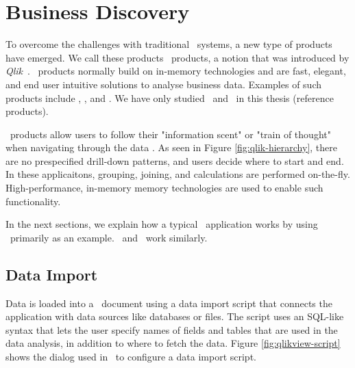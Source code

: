 \section{Business Discovery}
\label{sec:Business Discovery}
To overcome the challenges with traditional \bi~systems, a new type of products have emerged. We call these products \bd~products, a notion that was introduced by \textit{Qlik}~\cite{Qlik2014-vd}. \bd~products normally build on in-memory technologies and are fast, elegant, and end user intuitive solutions to analyse business data. Examples of such products include \powerpivot, \tableau, and \qlikview. We have only studied \qlikview~and \tableau~in this thesis (reference products). 


\bd~products allow users to follow their "information scent" or "train of thought" when navigating through the data \cite{Kamkolkar2015-iq, Qlik2014-vd}. As seen in Figure \ref{fig:qlik-hierarchy}, there are no prespecified drill-down patterns, and users decide where to start and end. In these applicaitons, grouping, joining, and calculations are performed on-the-fly. High-performance, in-memory memory technologies are used to enable such functionality. 

In the next sections, we explain how a typical \bd~application works by using \qlikview~primarily as an example. \tableau~and \powerpivot~work similarly.

\subsection{Data Import}
\label{sub:Data Import}


Data is loaded into a \qlikview~document using a data import script that connects the application with data sources like databases or files. The script uses an SQL-like syntax that lets the user specify names of fields and tables that are used in the data analysis, in addition to where to fetch the data.  Figure \ref{fig:qlikview-script} shows the dialog used in \qlikview~to configure a data import script.

